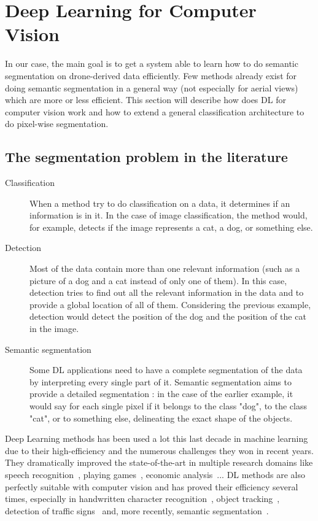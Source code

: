 \chapter{Deep Learning for Computer Vision}


In our case, the main goal is to get a system able to learn how to do semantic segmentation on drone-derived data efficiently. Few methods already exist for doing semantic segmentation in a general way (not especially for aerial views) which are more or less efficient. This section will describe how does DL for computer vision work and how to extend a general classification architecture to do pixel-wise segmentation.



\section{The segmentation problem in the literature}
\theoremstyle{definition}
\begin{description}
  \item[Classification] When a method try to do classification on a data, it determines if an information is in it. In the case of image classification, the method would, for example, detects if the image represents a cat, a dog, or something else.
  \item[Detection] Most of the data contain more than one relevant information (such as a picture of a dog and a cat instead of only one of them). In this case, detection tries to find out all the relevant information in the data and to provide a global location of all of them. Considering the previous example, detection would detect the position of the dog and the position of the cat in the image.
  \item[Semantic segmentation] Some DL applications need to have a complete segmentation of the data by interpreting every single part of it. Semantic segmentation aims to provide a detailed segmentation : in the case of the earlier example, it would say for each single pixel if it belongs to the class "dog", to the class "cat", or to something else, delineating the exact shape of the objects.
\end{description}


Deep Learning methods has been used a lot this last decade in machine learning due to their high-efficiency and the numerous challenges they won in recent years. They dramatically improved the state-of-the-art in multiple research domains like speech recognition~\cite{HINT12, DAHL12}, playing games~\cite{MNIH13, SILV16}, economic analysis~\cite{FEHR15}...
DL methods are also perfectly suitable with computer vision and has proved their efficiency several times, especially in handwritten character recognition~\cite{LECU95, CIRE12, BOTT94}, object tracking~\cite{WANG13, ROSS08}, detection of traffic signs~\cite{SERM11} and, more recently, semantic segmentation~\cite{LONG15, BADR15, FARA13}.

